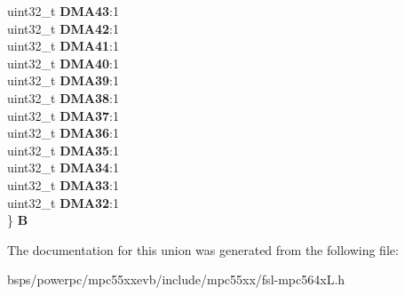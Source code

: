 \begin{DoxyCompactItemize}
\begin{tabbing}
\>uint32\_t {\bfseries DMA43}:1\\
\>uint32\_t {\bfseries DMA42}:1\\
\>uint32\_t {\bfseries DMA41}:1\\
\>uint32\_t {\bfseries DMA40}:1\\
\>uint32\_t {\bfseries DMA39}:1\\
\>uint32\_t {\bfseries DMA38}:1\\
\>uint32\_t {\bfseries DMA37}:1\\
\>uint32\_t {\bfseries DMA36}:1\\
\>uint32\_t {\bfseries DMA35}:1\\
\>uint32\_t {\bfseries DMA34}:1\\
\>uint32\_t {\bfseries DMA33}:1\\
\>uint32\_t {\bfseries DMA32}:1\\
\} {\bfseries B}\\

\end{tabbing}\end{DoxyCompactItemize}


The documentation for this union was generated from the following file\+:\begin{DoxyCompactItemize}
\item 
bsps/powerpc/mpc55xxevb/include/mpc55xx/fsl-\/mpc564x\+L.\+h\end{DoxyCompactItemize}
